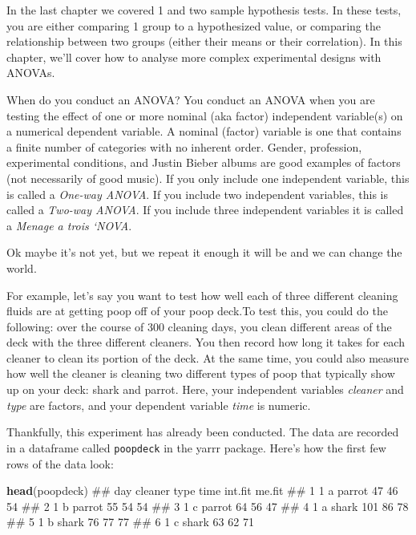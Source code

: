 \documentclass[]{book}
\newenvironment{Shaded}{\begin{snugshade}}{\end{snugshade}}
\newcommand{\KeywordTok}[1]{\textcolor[rgb]{0.13,0.29,0.53}{\textbf{#1}}}
\newcommand{\NormalTok}[1]{#1}
\theoremstyle{definition}
\theoremstyle{definition}
\theoremstyle{remark}
\begin{document}
In the last chapter we covered 1 and two sample hypothesis tests. In
these tests, you are either comparing 1 group to a hypothesized value,
or comparing the relationship between two groups (either their means or
their correlation). In this chapter, we'll cover how to analyse more
complex experimental designs with ANOVAs.

When do you conduct an ANOVA? You conduct an ANOVA when you are testing
the effect of one or more nominal (aka factor) independent variable(s)
on a numerical dependent variable. A nominal (factor) variable is one
that contains a finite number of categories with no inherent order.
Gender, profession, experimental conditions, and Justin Bieber albums
are good examples of factors (not necessarily of good music). If you
only include one independent variable, this is called a \emph{One-way
ANOVA}. If you include two independent variables, this is called a
\emph{Two-way ANOVA}. If you include three independent variables it is
called a \emph{Menage a trois `NOVA}.

Ok maybe it's not yet, but we repeat it enough it will be and we can
change the world.

For example, let's say you want to test how well each of three different
cleaning fluids are at getting poop off of your poop deck.To test this,
you could do the following: over the course of 300 cleaning days, you
clean different areas of the deck with the three different cleaners. You
then record how long it takes for each cleaner to clean its portion of
the deck. At the same time, you could also measure how well the cleaner
is cleaning two different types of poop that typically show up on your
deck: shark and parrot. Here, your independent variables \emph{cleaner}
and \emph{type} are factors, and your dependent variable \emph{time} is
numeric.

Thankfully, this experiment has already been conducted. The data are
recorded in a dataframe called \texttt{poopdeck} in the yarrr package.
Here's how the first few rows of the data look:

\begin{Shaded}
\begin{Highlighting}[]
\KeywordTok{head}\NormalTok{(poopdeck)}
\NormalTok{##   day cleaner   type time int.fit me.fit}
\NormalTok{## 1   1       a parrot   47      46     54}
\NormalTok{## 2   1       b parrot   55      54     54}
\NormalTok{## 3   1       c parrot   64      56     47}
\NormalTok{## 4   1       a  shark  101      86     78}
\NormalTok{## 5   1       b  shark   76      77     77}
\NormalTok{## 6   1       c  shark   63      62     71}
\end{Highlighting}
\end{Shaded}
\end{document}
